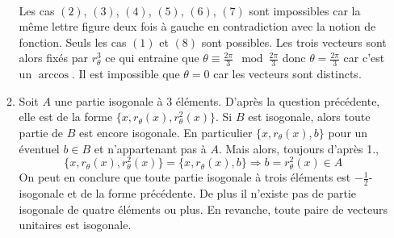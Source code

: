 \begin{enumerate}
\begin{enumerate}
\begin{align*}
\end{align*}
Les cas $(2)$, $(3)$, $(4)$, $(5)$, $(6)$, $(7)$ sont impossibles car la même lettre figure deux fois à gauche en contradiction avec la notion de fonction. Seuls les cas $(1)$ et $(8)$ sont possibles. Les trois vecteurs sont alors fixés par $r_\theta^3$ ce qui entraine que $\theta \equiv \frac{2\pi}{3} \mod \frac{2\pi}{3}$ donc $\theta=\frac{2\pi}{3}$ car c'est un $\arccos$. Il est impossible que $\theta=0$ car les vecteurs sont distincts.
 \item Soit $A$ une partie isogonale à $3$ éléments. D'après la question précédente, elle est de la forme $\{x,r_\theta(x),r^2_\theta(x)\}$. Si $B$ est isogonale, alors toute partie de $B$ est encore isogonale. En particulier $\{x,r_\theta(x),b\}$ pour un éventuel $b\in B$ et n'appartenant pas à $A$. Mais alors, toujours d'après 1.,
\begin{displaymath}
 \{x,r_\theta(x),r^2_\theta(x)\}=\{x,r_\theta(x),b\}\Rightarrow b=r^2_\theta(x)\in A
\end{displaymath}
On peut en conclure que toute partie isogonale à trois éléments est $-\frac{1}{2}$-isogonale et de la forme précédente. De plus il n'existe pas de partie isogonale de quatre éléments ou plus. En revanche, toute paire de vecteurs unitaires est isogonale.
\end{enumerate}
\end{enumerate}

